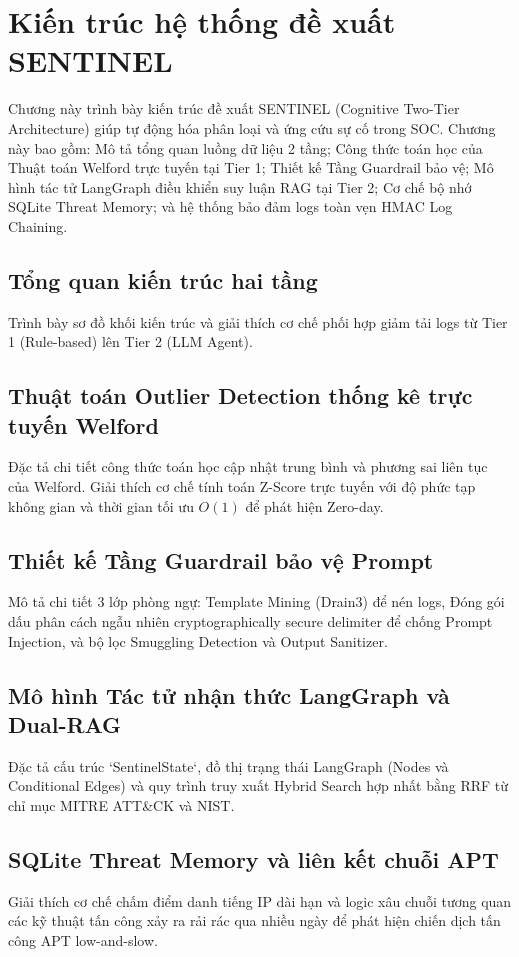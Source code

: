 \chapter{Kiến trúc hệ thống đề xuất SENTINEL}
\label{ch:proposed_solution}

Chương này trình bày kiến trúc đề xuất SENTINEL (Cognitive Two-Tier Architecture) giúp tự động hóa phân loại và ứng cứu sự cố trong SOC. Chương này bao gồm: Mô tả tổng quan luồng dữ liệu 2 tầng; Công thức toán học của Thuật toán Welford trực tuyến tại Tier 1; Thiết kế Tầng Guardrail bảo vệ; Mô hình tác tử LangGraph điều khiển suy luận RAG tại Tier 2; Cơ chế bộ nhớ SQLite Threat Memory; và hệ thống bảo đảm logs toàn vẹn HMAC Log Chaining.

\section{Tổng quan kiến trúc hai tầng}
Trình bày sơ đồ khối kiến trúc và giải thích cơ chế phối hợp giảm tải logs từ Tier 1 (Rule-based) lên Tier 2 (LLM Agent).

\section{Thuật toán Outlier Detection thống kê trực tuyến Welford}
Đặc tả chi tiết công thức toán học cập nhật trung bình và phương sai liên tục của Welford. Giải thích cơ chế tính toán Z-Score trực tuyến với độ phức tạp không gian và thời gian tối ưu $O(1)$ để phát hiện Zero-day.

\section{Thiết kế Tầng Guardrail bảo vệ Prompt}
Mô tả chi tiết 3 lớp phòng ngự: Template Mining (Drain3) để nén logs, Đóng gói dấu phân cách ngẫu nhiên cryptographically secure delimiter để chống Prompt Injection, và bộ lọc Smuggling Detection và Output Sanitizer.

\section{Mô hình Tác tử nhận thức LangGraph và Dual-RAG}
Đặc tả cấu trúc `SentinelState`, đồ thị trạng thái LangGraph (Nodes và Conditional Edges) và quy trình truy xuất Hybrid Search hợp nhất bằng RRF từ chỉ mục MITRE ATT\&CK và NIST.

\section{SQLite Threat Memory và liên kết chuỗi APT}
Giải thích cơ chế chấm điểm danh tiếng IP dài hạn và logic xâu chuỗi tương quan các kỹ thuật tấn công xảy ra rải rác qua nhiều ngày để phát hiện chiến dịch tấn công APT low-and-slow.

